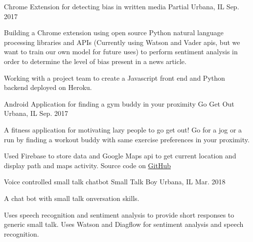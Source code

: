 \vspace*{-0.25cm}
\begin{cventries}
  \cventry
    {Chrome Extension for detecting bias in written media}
    {Partial}
    {Urbana, IL}
    {Sep. 2017}
    {
        \begin{cvitems}
          \item {Building a Chrome extension using open source Python natural language processing libraries and APIs (Currently using Watson and Vader apis, but we want to train our own model for future uses) to perform sentiment analysis in order to determine the level of bias present in a news article.}
          \item {Working with a project team to create a Javascript front end and Python backend deployed on Heroku.}
          \end{cvitems}
    }
    \vspace*{-0.07cm}
    \cventry
    {Android Application for finding a gym buddy in your proximity}
    {Go Get Out}
    {Urbana, IL}
    {Sep. 2017}
    {
        \begin{cvitems}
          \item {A fitness application for motivating lazy people to go get out! Go for a jog or a run by finding a workout buddy with same exercise preferences in your proximity.}
          \item {Used Firebase to store data and Google Maps api to get current location and display path and maps activity. Source code on \hyperlink{https://github.com/itsmesatwik}{GitHub}}
          \end{cvitems}
    }
    \vspace*{-0.07cm}
    \cventry
    {Voice controlled small talk chatbot}
    {Small Talk Boy}
    {Urbana, IL}
    {Mar. 2018}
    {
        \begin{cvitems}
          \item {A chat bot with small talk onversation skills.}
          \item {Uses speech recognition and sentiment analysis to provide short responses to generic small talk. Uses Watson and Diagflow for sentiment analysis and speech recognition.}
          \end{cvitems}
    }
    \vspace*{-0.45cm}
\end{cventries}
